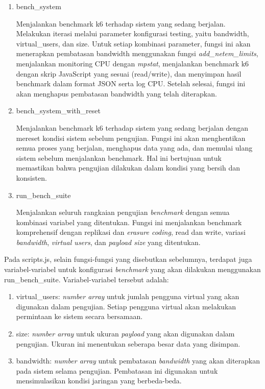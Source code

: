 \begin{enumerate}  
  \item bench\_system
  
  Menjalankan benchmark k6 terhadap sistem yang sedang berjalan. Melakukan iterasi melalui parameter konfigurasi testing, yaitu bandwidth, virtual\_users, dan size. Untuk setiap kombinasi parameter, fungsi ini akan menerapkan pembatasan bandwidth menggunakan fungsi \textit{add\_netem\_limits}, menjalankan monitoring CPU dengan \textit{mpstat}, menjalankan benchmark k6 dengan skrip JavaScript yang sesuai (read/write), dan menyimpan hasil benchmark dalam format JSON serta log CPU. Setelah selesai, fungsi ini akan menghapus pembatasan bandwidth yang telah diterapkan.

  \item bench\_system\_with\_reset

  Menjalankan benchmark k6 terhadap sistem yang sedang berjalan dengan mereset kondisi sistem sebelum pengujian. Fungsi ini akan menghentikan semua proses yang berjalan, menghapus data yang ada, dan memulai ulang sistem sebelum menjalankan benchmark. Hal ini bertujuan untuk memastikan bahwa pengujian dilakukan dalam kondisi yang bersih dan konsisten.
  
  \item run\_bench\_suite
  
  Menjalankan seluruh rangkaian pengujian \textit{benchmark} dengan semua kombinasi variabel yang ditentukan. Fungsi ini menjalankan benchmark komprehensif dengan replikasi dan \textit{erasure coding}, read dan write, variasi \textit{bandwidth}, \textit{virtual users}, dan \textit{payload size} yang ditentukan.
\end{enumerate}

Pada scripts.js, selain fungsi-fungsi yang disebutkan sebelumnya, terdapat juga variabel-variabel untuk konfigurasi \textit{benchmark} yang akan dilakukan menggunakan run\_bench\_suite. Variabel-variabel tersebut adalah:

\begin{enumerate}
  \item virtual\_users: \textit{number array} untuk jumlah pengguna virtual yang akan digunakan dalam pengujian. Setiap pengguna virtual akan melakukan permintaan ke sistem secara bersamaan.
  \item size: \textit{number array} untuk ukuran \textit{payload} yang akan digunakan dalam pengujian. Ukuran ini menentukan seberapa besar data yang disimpan.
  \item bandwidth: \textit{number array} untuk pembatasan \textit{bandwidth} yang akan diterapkan pada sistem selama pengujian. Pembatasan ini digunakan untuk mensimulasikan kondisi jaringan yang berbeda-beda.
\end{enumerate}

